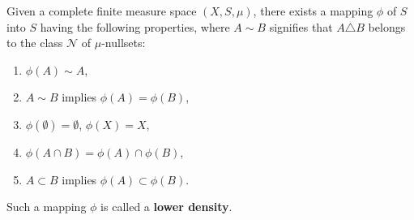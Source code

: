 Given a complete finite measure space $(X, S, \mu)$, there exists a mapping $\phi$ of $S$ into $S$ having the following properties, where $A \sim B$ signifies that $A \triangle B$ belongs to the class $\mathcal{N}$ of $\mu$-nullsets:

\begin{enumerate}
\item $\phi(A) \sim A$,
\item $A \sim B$ implies $\phi(A) = \phi(B)$,
\item $\phi(\emptyset) = \emptyset$, $\phi(X) = X$,
\item $\phi(A \cap B) = \phi(A) \cap \phi(B)$,
\item $A \subset B$ implies $\phi(A) \subset \phi(B)$.
\end{enumerate}

Such a mapping $\phi$ is called a \textbf{lower density}.
